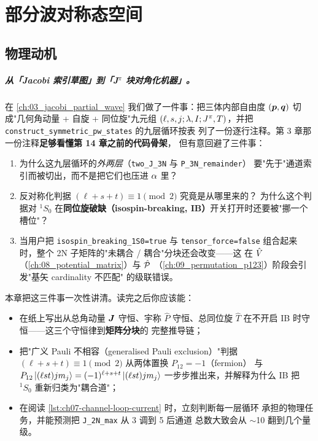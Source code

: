 
\chapter{部分波对称态空间}
\label{ch:07_pw_symm_states}

\section{物理动机}
\label{sec:ch07-motivation}

\paragraph{从「Jacobi 索引草图」到「J\(^{\pi}\) 块对角化机器」。}
在 \cref{ch:03_jacobi_partial_wave} 我们做了一件事：把三体内部自由度
\((\bm{p}, \bm{q})\) 切成"几何角动量 + 自旋 + 同位旋"九元组
\((\ell, s, j; \lambda, I; J^\pi, T)\)，并把 \texttt{construct\_symmetric\_pw\_states} 的九层循环按表
列了一份逐行注释。第 3 章那一份注释\textbf{足够看懂第 14 章之前的代码骨架}，
但有意回避了三件事：

\begin{enumerate}
  \item 为什么这九层循环的\emph{外两层}（\verb|two_J_3N| 与 \verb|P_3N_remainder|）
        要"先于"通道索引而被切出，而不是把它们也压进 \(\alpha\) 里？
  \item 反对称化判据 \((\ell + s + t) \equiv 1 \pmod{2}\) 究竟是从哪里来的？
        为什么这个判据对 \({}^1S_0\) 在\textbf{同位旋破缺（isospin-breaking,
        IB）}开关打开时还要被"挪一个槽位"？
  \item 当用户把 \texttt{isospin\_breaking\_1S0=true} 与 \texttt{tensor\_force=false}
        组合起来时，整个 2N 子矩阵的"未耦合 / 耦合"分块还会改变——这
        在 \(\hat{V}\)（\cref{ch:08_potential_matrix}）与 \(\hat{\mathcal{P}}\)
        （\cref{ch:09_permutation_p123}）阶段会引发"基矢 cardinality 不匹配"
        的级联错误。
\end{enumerate}

本章把这三件事一次性讲清。读完之后你应该能：

\begin{itemize}
  \item 在纸上写出从总角动量 \(\bm{J}\) 守恒、宇称 \(\hat{P}\) 守恒、总同位旋
        \(\hat{T}\) 在不开启 IB 时守恒——这三个守恒律到\textbf{矩阵分块}的
        完整推导链；
  \item 把"广义 Pauli 不相容（generalised Pauli exclusion）"判据
        \((\ell + s + t)\equiv 1 \pmod{2}\) 从两体置换 \(P_{12} = -1\)（fermion）
        与 \(P_{12} \ket{(\ell s t) j m_j} = (-1)^{\ell+s+t}\ket{(\ell s t) j m_j}\)
        一步步推出来，并解释为什么 IB 把 \({}^1S_0\) 重新归类为"耦合道"；
  \item 在阅读 \cref{lst:ch07-channel-loop-current} 时，立刻判断每一层循环
        承担的物理任务，并能预测把 \texttt{J\_2N\_max} 从 3 调到 5 后通道
        总数大致会从 \(\sim\)10 翻到几个量级。
\end{itemize}

